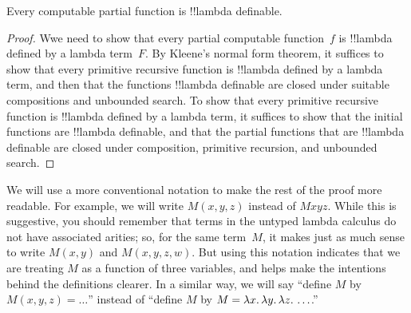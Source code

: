 \documentclass[../../../include/open-logic-section]{subfiles}
\begin{document}

\begin{thm}
Every computable partial function is !!{lambda definable}.
\end{thm}

\begin{proof}
Wwe need to show that every partial computable function~$f$ is
!!{lambda defined} by a lambda term~$F$. By Kleene's normal form
theorem, it suffices to show that every primitive recursive function
is !!{lambda defined} by a lambda term, and then that the functions
!!{lambda definable} are closed under suitable compositions and
unbounded search. To show that every primitive recursive function is
!!{lambda defined} by a lambda term, it suffices to show that the
initial functions are !!{lambda definable}, and that the partial
functions that are !!{lambda definable} are closed under
composition, primitive recursion, and unbounded search.
\end{proof}

We will use a more conventional notation to make the rest of the proof
more readable. For example, we will write $M(x, y, z)$ instead of
$Mxyz$. While this is suggestive, you should remember that terms in
the untyped lambda calculus do not have associated arities; so, for
the same term~$M$, it makes just as much sense to write $M(x,y)$ and
$M(x,y,z,w)$. But using this notation indicates that we are treating
$M$ as a function of three variables, and helps make the intentions
behind the definitions clearer. In a similar way, we will say ``define
$M$ by $M(x,y,z) = \dots$'' instead of ``define $M$ by $M =
\lambd[x][\lambd[y][\lambd[z][\dots]]]$.''
\end{document}
